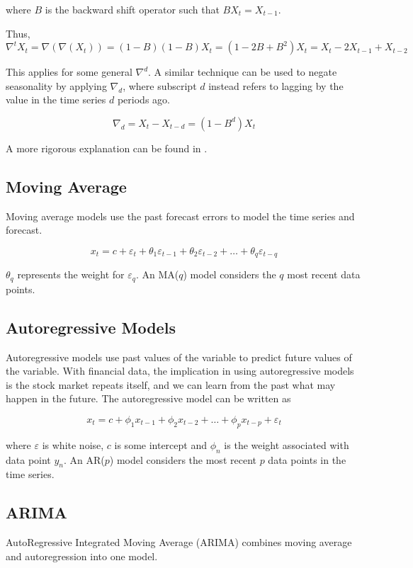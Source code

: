 \documentclass[12pt]{article}
\begin{document}
where $B$ is the backward shift operator such that $BX_t = X_{t-1}$.

Thus, $$\nabla^t X_t = \nabla(\nabla(X_t)) = (1-B)(1-B)X_t = (1-2B+B^2)X_t = X_t-2X_{t-1}+X_{t-2}$$

This applies for some general $\nabla^d$. A similar technique can be used to negate seasonality by applying $\nabla_d$, where subscript $d$ instead refers to lagging by the value in the time series $d$ periods ago.

$$\nabla_d = X_t - X_{t-d} = (1-B^d) X_t$$

A more rigorous explanation can be found in \cite[22-32]{timeseries}.

\subsection{Moving Average}
Moving average models use the past forecast errors to model the time series and forecast. 

$$ x_{t} = c + \varepsilon_t + \theta_{1}\varepsilon_{t-1} + \theta_{2}\varepsilon_{t-2} + \dots + \theta_{q}\varepsilon_{t-q}$$

$\theta_q$ represents the weight for $\varepsilon_q$. An MA($q$) model considers the $q$ most recent data points. \cite[8.4]{forecasting}


\subsection{Autoregressive Models}
Autoregressive models use past values of the variable to predict future values of the variable. With financial data, the implication in using autoregressive models is the stock market repeats itself, and we can learn from the past what may happen in the future. \cite[8.3]{forecasting} The autoregressive model can be written as 

$$x_{t} = c + \phi_{1}x_{t-1} + \phi_{2}x_{t-2} + \dots + \phi_{p}x_{t-p} + \varepsilon_{t}$$

where $\varepsilon$ is white noise, $c$ is some intercept and $\phi_n$ is the weight associated with data point $y_n$. An AR($p$) model considers the most recent $p$ data points in the time series.

\subsection{ARIMA}
AutoRegressive Integrated Moving Average (ARIMA) combines moving average and autoregression into one model. 
\end{document}
